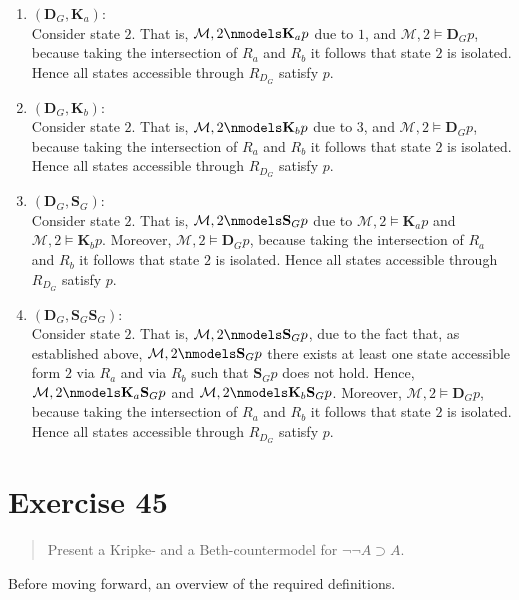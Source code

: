 \documentclass[11pt,a4paper]{article}
\newcommand{\lto}{\supset}
\newcommand{\eall}{\mathbf{K}}
\newcommand{\edisp}{\mathbf{S}}
\newcommand{\edist}{\mathbf{D}}
\begin{document}
\begin{enumerate}
\item $(\edist_G, \eall_a)$:\\
Consider state $2$. That is, $\mathcal{M},2 \nmodels \eall_a p$ due to $1$, and $\mathcal{M},2 \models \edist_G p$, because taking the intersection of $R_a$ and $R_b$ it follows that state $2$ is isolated. Hence all states accessible through $R_{D_G}$ satisfy $p$.

\item $(\edist_G, \eall_b)$:\\
Consider state $2$. That is, $\mathcal{M},2 \nmodels \eall_b p$ due to $3$, and $\mathcal{M},2 \models \edist_G p$, because taking the intersection of $R_a$ and $R_b$ it follows that state $2$ is isolated. Hence all states accessible through $R_{D_G}$ satisfy $p$.

\item $(\edist_G, \edisp_G)$:\\
Consider state $2$. That is, $\mathcal{M},2 \nmodels \edisp_G p$ due to $\mathcal{M},2 \models \eall_a p$  and $\mathcal{M},2 \models \eall_b p$. Moreover, $\mathcal{M},2 \models \edist_G p$, because taking the intersection of $R_a$ and $R_b$ it follows that state $2$ is isolated. Hence all states accessible through $R_{D_G}$ satisfy $p$.

\item $(\edist_G,  \edisp_G \edisp_G)$:\\
Consider state $2$. That is, $\mathcal{M},2 \nmodels \edisp_G p$, due to the fact that, as established above, $\mathcal{M},2 \nmodels \edisp_G p$  there exists at least one state accessible form $2$ via $R_a$ and via $R_b$ such that $\edisp_G p$ does not hold. Hence, $\mathcal{M},2 \nmodels  \eall_a \edisp_G p $ and $\mathcal{M},2 \nmodels \eall_b \edisp_G p$. Moreover, $\mathcal{M},2 \models \edist_G p$, because taking the intersection of $R_a$ and $R_b$ it follows that state $2$ is isolated. Hence all states accessible through $R_{D_G}$ satisfy $p$.
\end{enumerate}



\section*{Exercise 45}
\begin{quote}
Present a Kripke- and a Beth-countermodel for $\neg \neg A \lto A$.
\end{quote}
Before moving forward, an overview of the required definitions. 
\end{document}
